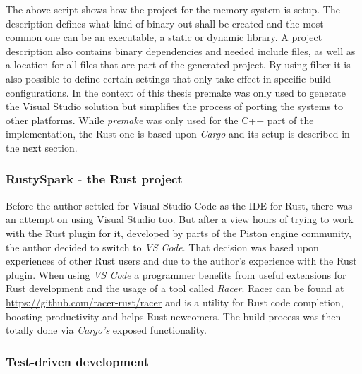 \noindent
The above script shows how the project for the memory system is setup. The description defines what kind of binary out shall be created and the most common one can be an executable, a static or dynamic library. A project description also contains binary dependencies and needed include files, as well as a location for all files that are part of the generated project. By using filter it is also possible to define certain settings that only take effect in specific build configurations. In the context of this thesis premake was only used to generate the Visual Studio solution but simplifies the process of porting the systems to other platforms. While \textit{premake} was only used for the C++ part of the implementation, the Rust one is based upon \textit{Cargo} and its setup is described in the next section.

\subsubsection{RustySpark - the Rust project}

Before the author settled for Visual Studio Code as the \ac{IDE} for Rust, there was an attempt on using Visual Studio too. But after a view hours of trying to work with the Rust plugin for it, developed by parts of the Piston engine community, the author decided to switch to \textit{VS Code}. That decision was based upon experiences of other Rust users and due to the author's experience with the Rust plugin. When using \textit{VS Code} a programmer benefits from useful extensions for Rust development and the usage of a tool called \textit{Racer}. Racer can be found at \url{https://github.com/racer-rust/racer} and is a utility for Rust code completion, boosting productivity and helps Rust newcomers. The build process was then totally done via \textit{Cargo's} exposed functionality. 

\subsubsection{Test-driven development} \label{tdd}

